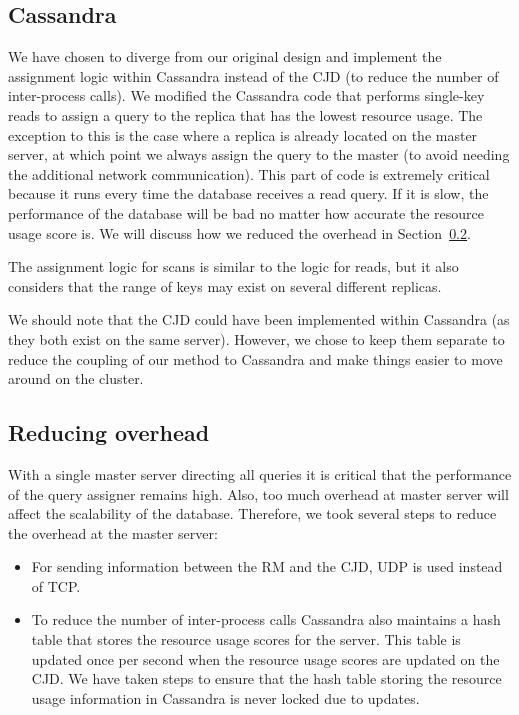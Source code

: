 \subsection{Cassandra}
We have chosen to diverge from our original design and implement the assignment logic within Cassandra instead of the CJD (to reduce the number of inter-process calls). We modified the Cassandra code that performs single-key reads to assign a query to the replica that has the lowest resource usage. The exception to this is the case where a replica is already located on the master server, at which point we always assign the query to the master (to avoid needing the additional network communication). This part of code is extremely critical because it runs every time the database receives a read query. If it is slow, the performance of the database will be bad no matter how accurate the resource usage score is. We will discuss how we reduced the overhead in Section~\ref{sec:impl_overhead}.

The assignment logic for scans is similar to the logic for reads, but it also considers that the range of keys may exist on several different replicas.

We should note that the CJD could have been implemented within Cassandra (as they both exist on the same server). However, we chose to keep them separate to reduce the coupling of our method to Cassandra and make things easier to move around on the cluster.

\subsection{Reducing overhead}
\label{sec:impl_overhead}

With a single master server directing all queries it is critical that the performance of the query assigner remains high. Also, too much overhead at master server will affect the scalability of the database. Therefore, we took several steps to reduce the overhead at the master server:

\begin{itemize}
\item
For sending information between the RM and the CJD, UDP is used instead of TCP.

\item
To reduce the number of inter-process calls Cassandra also maintains a hash table that stores the resource usage scores for the server. This table is updated once per second when the resource usage scores are updated on the CJD. We have taken steps to ensure that the hash table storing the resource usage information in Cassandra is never locked due to updates. 
\end{itemize}
